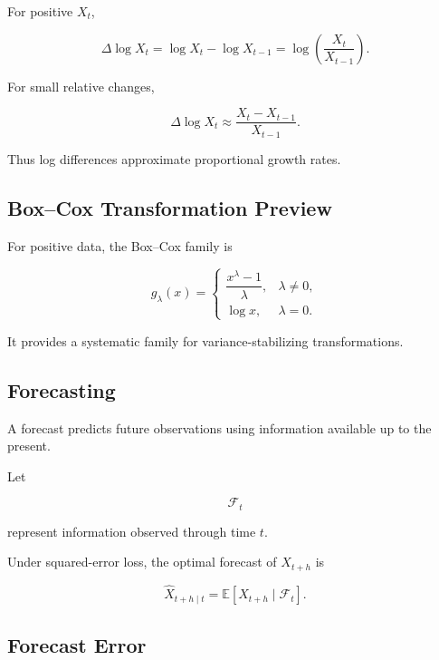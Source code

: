 For positive \(X_t\),

\[
\boxed{
\Delta\log X_t
=
\log X_t
-
\log X_{t-1}
=
\log
\left(
\frac{
X_t
}{
X_{t-1}
}
\right).
}
\]

For small relative changes,

\[
\boxed{
\Delta\log X_t
\approx
\frac{
X_t-X_{t-1}
}{
X_{t-1}
}.
}
\]

Thus log differences approximate proportional growth rates.

\subsection{Box--Cox Transformation Preview}
\label{subsec:box-cox-time-series}

For positive data, the Box--Cox family is

\[
\boxed{
g_\lambda(x)
=
\begin{cases}
\dfrac{x^\lambda-1}{\lambda},
&
\lambda\neq0,
\\[1em]
\log x,
&
\lambda=0.
\end{cases}
}
\]

It provides a systematic family for variance-stabilizing
transformations.

\subsection{Forecasting}
\label{subsec:time-series-forecasting}

A forecast predicts future observations using information available up to
the present.

Let

\[
\mathcal{F}_t
\]

represent information observed through time \(t\).

Under squared-error loss, the optimal forecast of \(X_{t+h}\) is

\[
\boxed{
\widehat{X}_{t+h\mid t}
=
\mathbb{E}
[
X_{t+h}
\mid
\mathcal{F}_t
].
}
\]

\subsection{Forecast Error}
\label{subsec:forecast-error}

